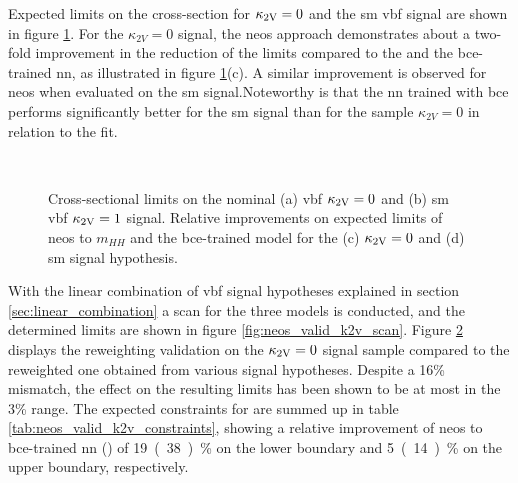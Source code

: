 Expected limits on the cross-section for $\kappa_{\text{2V}}=0$ and the \ac{sm} \ac{vbf} signal are shown in figure \ref{fig:neos_valid_brazil_limits}.  For the $\kappa_{2V} = 0$ signal, the \ac{neos} approach demonstrates about a two-fold improvement in the reduction of the limits compared to the \mhh and the \ac{bce}-trained \ac{nn}, as illustrated in figure \ref{fig:neos_valid_brazil_limits}(c). A similar improvement is observed for \ac{neos} when evaluated on the \ac{sm} signal.Noteworthy is that the \ac{nn} trained with \ac{bce} performs significantly better for the \ac{sm} signal than for the sample $\kappa_{2V} = 0$ in relation to the \mhh fit.

\begin{figure}
    \centering
    \\
    \caption[]{Cross-sectional limits on the nominal (a) \ac{vbf} $\kappa_{\text{2V}}=0$ and (b) \ac{sm} \ac{vbf} $\kappa_{\text{2V}}=1$ signal. Relative improvements on expected limits of \ac{neos} to $m_{HH}$ and the \ac{bce}-trained model for the (c) $\kappa_{\text{2V}}=0$ and (d) \ac{sm} signal hypothesis.}
    \label{fig:neos_valid_brazil_limits}
\end{figure}

With the linear combination of \ac{vbf} signal hypotheses explained in section \ref{sec:linear_combination} a \ktwov scan for the three models is conducted, and the determined limits are shown in figure \ref{fig:neos_valid_k2v_scan}. Figure \ref{fig:reweight_validation} displays the reweighting validation on the $\kappa_{\text{2V}}=0$ signal sample compared to the reweighted one obtained from various signal hypotheses.  Despite a 16\% mismatch, the effect on the resulting limits has been shown to be at most in the 3\% range. The expected constraints for \ktwov are summed up in table \ref{tab:neos_valid_k2v_constraints}, showing a relative improvement of neos to \ac{bce}-trained \ac{nn} (\mhh) of \qty[]{19}{(38)\percent} on the lower boundary and \qty[]{5}{(14)\percent} on the upper boundary, respectively.


\begin{figure}
    \centering
     \\
    \caption[]{}
    \label{fig:reweight_validation}
\end{figure}

